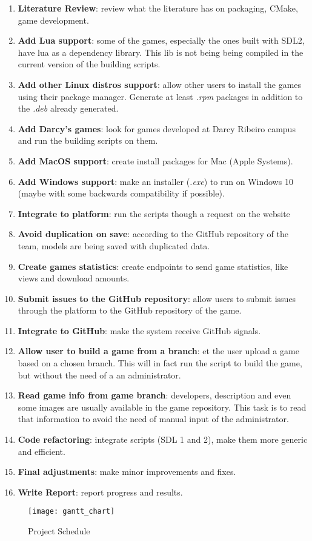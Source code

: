 \begin{enumerate}
\item \textbf{Literature Review}: review what the literature has on packaging, CMake, game development.
\item \textbf{Add Lua support}: some of the games, especially the ones built with SDL2, have lua as a dependency library. This lib is not being being compiled in the current version of the building scripts.
\item \textbf{Add other Linux distros support}: allow other users to install the games using their package manager. Generate at least \textit{.rpm} packages in addition to the \textit{.deb} already generated.
\item \textbf{Add Darcy's games}: look for games developed at Darcy Ribeiro campus and run the building scripts on them.
\item \textbf{Add MacOS support}: create install packages for Mac (Apple Systems).
\item \textbf{Add Windows support}: make an installer (\textit{.exe}) to run on Windows 10 (maybe with some backwards compatibility if possible).
\item \textbf{Integrate to platform}: run the scripts though a request on the website
\item \textbf{Avoid duplication on save}: according to the GitHub repository of the team, models are being saved with duplicated data.
\item \textbf{Create games statistics}: create endpoints to send game statistics, like views and download amounts.
\item \textbf{Submit issues to the GitHub repository}: allow users to submit issues through the platform to the GitHub repository of the game.
\item \textbf{Integrate to GitHub}: make the system receive GitHub signals.
\item \textbf{Allow user to build a game from a branch}: et the user upload a game based on a chosen branch. This will in fact run the script to build the game, but without the need of a an administrator.
\item \textbf{Read game info from game branch}: developers, description and even some images are usually available in the game repository. This task is to read that information to avoid the need of manual input of the administrator.
\item \textbf{Code refactoring}: integrate scripts (SDL 1 and 2), make them more generic and efficient.
\item \textbf{Final adjustments}: make minor improvements and fixes.
\item \textbf{Write Report}: report progress and results.
\end{enumerate}

\begin{figure}[h!]
\centering
\texttt{[image: gantt\_chart]}
\caption{Project Schedule}
\label{fig:schedule}
\end{figure}
